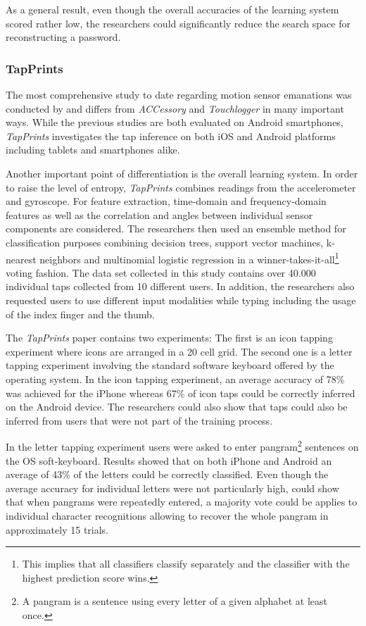 As a general result, even though the overall accuracies of the learning system scored rather low, the researchers could significantly reduce the search space for reconstructing a password.

\subsubsection{TapPrints}

The most comprehensive study to date regarding motion sensor emanations was conducted by \citeauthor{Tapprints} and differs from \textit{ACCessory} and \textit{Touchlogger} in many important ways. While the previous studies are both evaluated on Android smartphones, \textit{TapPrints} investigates the tap inference on both iOS and Android platforms including tablets and smartphones alike. 

Another important point of differentiation is the overall learning system. In order to raise the level of entropy, \textit{TapPrints} combines readings from the accelerometer and gyroscope. For feature extraction, time-domain and frequency-domain features as well as the correlation and angles between individual sensor components are considered. The researchers then used an ensemble method for classification purposes combining decision trees, support vector machines, k-nearest neighbors and multinomial logistic regression in a winner-takes-it-all\footnote{This implies that all classifiers classify separately and the classifier with the highest prediction score wins.} voting fashion. The data set collected in this study contains over 40.000 individual taps collected from 10 different users. In addition, the researchers also requested users to use different input modalities while typing including the usage of the index finger and the thumb.

The \textit{TapPrints} paper contains two experiments: The first is an icon tapping experiment where icons are arranged in a 20 cell grid. The second one is a letter tapping experiment involving the standard software keyboard offered by the operating system. In the icon tapping experiment, an average accuracy of 78\% was achieved for the iPhone whereas 67\% of icon taps could be correctly inferred on the Android device. The researchers could also show that taps could also be inferred from users that were not part of the training process.

In the letter tapping experiment users were asked to enter pangram\footnote{A pangram is a sentence using every letter of a given alphabet at least once.} sentences on the OS soft-keyboard. Results showed that on both iPhone and Android an average of 43\% of the letters could be correctly classified. Even though the average accuracy for individual letters were not particularly high, \citeauthor{Tapprints} could show that when pangrams were repeatedly entered, a majority vote could be applies to individual character recognitions allowing to recover the whole pangram in approximately 15 trials. 

